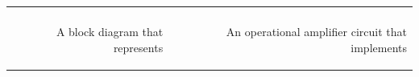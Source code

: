 \documentclass[aspectratio=169]{beamer}
\begin{document}
\begin{frame}[fragile]
\begin{tabular}{r}
\begin{columns}
\begin{column}{.5\textwidth}
\begin{center}
		    \end{center}
		\end{column}
	\end{columns}\\
			\begin{columns}
		  \begin{column}{.5\textwidth}  %
		    \begin{center}
    	  \tiny		A block diagram that represents	
		    \end{center}
		\end{column}
			  \begin{column}{.5\textwidth}  %
		    \begin{center}
    	  \tiny		An operational amplifier circuit that implements	
		    \end{center}
		\end{column}
	\end{columns}

	
\end{tabular}
\end{frame}
	
\end{document}
